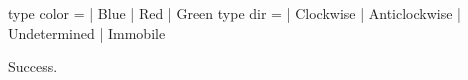 \chklistingtrue
{}
\begin{ChkListingMsg}
type color   =  | Blue  | Red  | Green 
type dir   =  | Clockwise  | Anticlockwise  | Undetermined  | Immobile 
\end{ChkListingMsg}
\begin{ChkListingErr}
Success.
\end{ChkListingErr}
